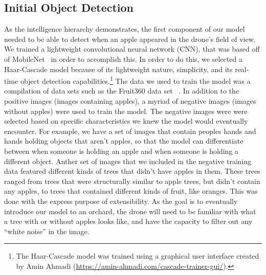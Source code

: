 \subsection{Initial Object Detection}
As the intelligence hierarchy demonstrates, the first component of our model needed to be able to detect when an apple appeared in the drone's field of view. 
We trained a lightweight convolutional neural network (CNN), that was based off of MobileNet~\cite{Sandler2018,PyTorchMobileNet} in order to accomplish this. 
In order to do this, we selected a Haar-Cascade model because of its lightweight nature, simplicity, and its real-time object detection capabilities.\footnote{The Haar-Cascade model was trained using a graphical user interface created by Amin Ahmadi (\url{https://amin-ahmadi.com/cascade-trainer-gui/}).} 
The data we used to train the model was a compilation of data sets such as the Fruit360 data set ~\cite{Fruit360}.
In addition to the positive images (images containing apples), a myriad of negative images (images without apples) were used to train the model.
The negative images were were selected based on specific characteristics we knew the model would eventually encounter. 
For example, we have a set of images that contain peoples hands and hands holding objects that aren't apples, so that the model can differentiate between when someone is holding an apple and when someone is holding a different object.
Anther set of images that we included in the negative training data featured different kinds of trees that didn't have apples in them.
These trees ranged from trees that were structurally similar to apple trees, but didn't contain any apples, to trees that contained different kinds of fruit, like oranges.
This was done with the express purpose of extensibility.
As the goal is to eventually introduce our model to an orchard, the drone will need to be familiar with what a tree with or without apples looks like, and have the capacity to filter out any ``white noise'' in the image.

